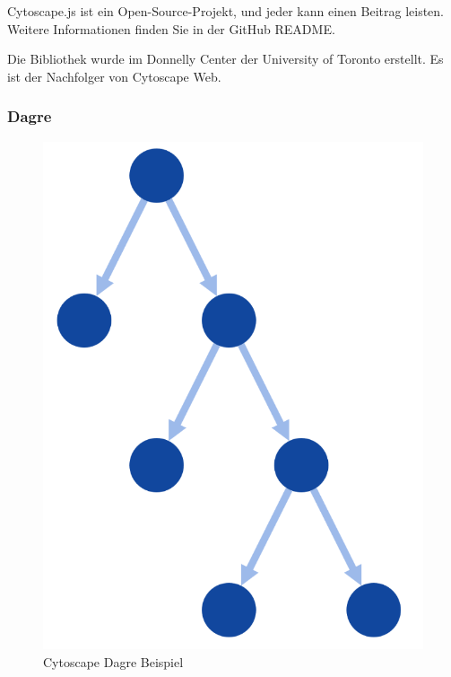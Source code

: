 Cytoscape.js ist ein Open-Source-Projekt, und jeder kann einen Beitrag leisten. Weitere Informationen finden Sie in der GitHub README.

Die Bibliothek wurde im Donnelly Center der University of Toronto erstellt. Es ist der Nachfolger von Cytoscape Web.

\subsubsection{Dagre}\label{sec:cytoscape-dagre}

\begin{figure}[H] 
    \begin{center}
        \includegraphics[scale=0.5]{images/cytoscape-dagre-example.png}
        \caption{Cytoscape Dagre Beispiel \cite{cytoscape_dagre}}
        \label{abb:cytoscape-dagre_example}
    \end{center}    
\end{figure}

